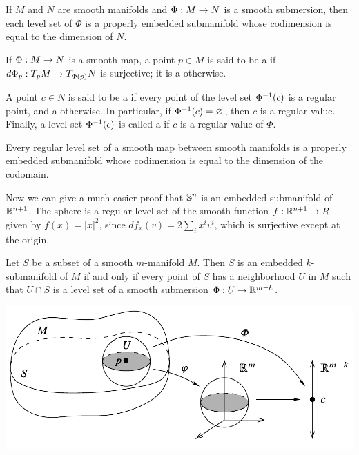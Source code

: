 \begin{cor}
If $M$ and $N$ are smooth manifolds and $\Phi:M\rightarrow N$ is a smooth submersion, then each level set of $\Phi$ is a properly embedded submanifold whose codimension is equal to the dimension of $N$.
\end{cor}

\dfn If $\Phi:M\rightarrow N$ is a smooth map, a point $p\in M$ is said to be a  if $d\Phi_p:T_pM\rightarrow T_{\Phi(p)}N$ is surjective; it is a  otherwise.

\dfn A point $c\in N$ is said to be a  if every point of the level set $\Phi^{-1}(c)$ is a regular point, and a  otherwise. In particular, if $\Phi^{-1}(c) = \varnothing$, then $c$ is a regular value. Finally, a level set $\Phi^{-1}(c)$ is called a  if $c$ is a regular value of $\Phi$.

\begin{cor}
Every regular level set of a smooth map between smooth manifolds is a properly embedded submanifold whose codimension is equal to the dimension of the codomain.
\end{cor}

\begin{ex}
Now we can give a much easier proof that $\mathbb{S}^n$ is an embedded submanifold of $\mathbb{R}^{n + 1}$. The sphere is a regular level set of the smooth function $f:\mathbb{R}^{n + 1}\rightarrow R$ given by $f(x) = |x|^2$, since $df_x(v) = 2\sum_ix^iv^i$, which is surjective except at the origin.
\end{ex}

\begin{prop}
Let $S$ be a subset of a smooth $m$-manifold $M$. Then $S$ is an embedded $k$-submanifold of $M$ if and only if every point of $S$ has a neighborhood $U$ in $M$ such that $U\cap S$ is a level set of a smooth submersion $\Phi:U\rightarrow \mathbb{R}^{m - k}$.
\end{prop}

\begin{center}
    \includegraphics[scale = 0.43]{chapter05/c5f6.png}
\end{center}

